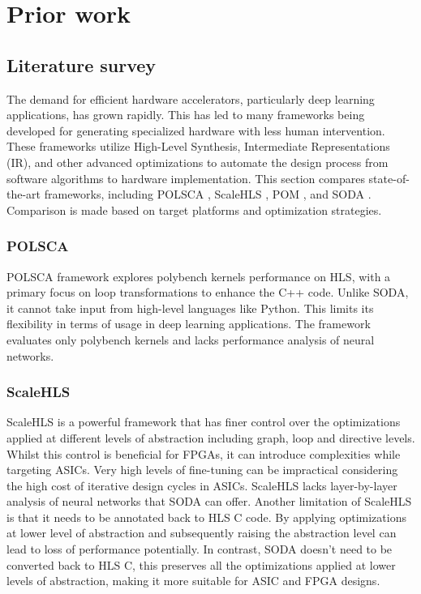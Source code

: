 \fancyhf{}
\fancyfoot[CO, CE]{ \thepage}

\chapter{Prior work}
\label{chapter2}

\section{Literature survey}

The demand for efficient hardware accelerators, particularly deep learning applications, has grown rapidly. This has led to many frameworks being developed for generating specialized hardware with less human intervention. These frameworks utilize High-Level Synthesis, Intermediate Representations (IR), and other advanced optimizations to automate the design process from software algorithms to hardware implementation. This section compares state-of-the-art frameworks, including POLSCA \cite{POLSCA}, ScaleHLS \cite{DBLP:journals/corr/abs-2107-11673}, POM \cite{zhang2024optimizingframeworkmlirefficient}, and SODA \cite{BohmAgostini2022BridgingPT}. Comparison is made based on target platforms and optimization strategies.

\subsection{POLSCA}

POLSCA \cite{POLSCA} framework explores polybench kernels performance on HLS, with a primary focus on loop transformations to enhance the C++ code. Unlike SODA, it cannot take input from high-level languages like Python. This limits its flexibility in terms of usage in deep learning applications. The framework evaluates only polybench kernels and lacks performance analysis of neural networks.

\subsection{ScaleHLS}

ScaleHLS \cite{DBLP:journals/corr/abs-2107-11673} is a powerful framework that has finer control over the optimizations applied at different levels of abstraction including graph, loop and directive levels. Whilst this control is beneficial for FPGAs, it can introduce complexities while targeting ASICs. Very high levels of fine-tuning can be impractical considering the high cost of iterative design cycles in ASICs. ScaleHLS lacks layer-by-layer analysis of neural networks that SODA can offer. Another limitation of ScaleHLS is that it needs to be annotated back to HLS C code. By applying optimizations at lower level of abstraction and subsequently raising the abstraction level can lead to loss of performance potentially. In contrast, SODA doesn't need to be converted back to HLS C, this preserves all the optimizations applied at lower levels of abstraction, making it more suitable for ASIC and FPGA designs.

